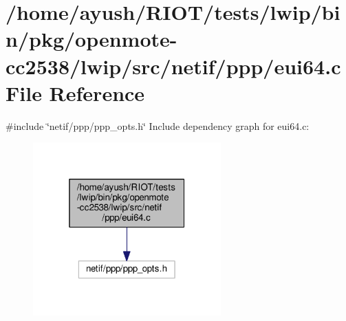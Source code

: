 \hypertarget{openmote-cc2538_2lwip_2src_2netif_2ppp_2eui64_8c}{}\section{/home/ayush/\+R\+I\+O\+T/tests/lwip/bin/pkg/openmote-\/cc2538/lwip/src/netif/ppp/eui64.c File Reference}
\label{openmote-cc2538_2lwip_2src_2netif_2ppp_2eui64_8c}
{\ttfamily \#include \char`\"{}netif/ppp/ppp\+\_\+opts.\+h\char`\"{}}\newline
Include dependency graph for eui64.\+c\+:
\nopagebreak
\begin{figure}[H]
\begin{center}
\leavevmode
\includegraphics[width=205pt]{openmote-cc2538_2lwip_2src_2netif_2ppp_2eui64_8c__incl}
\end{center}
\end{figure}
